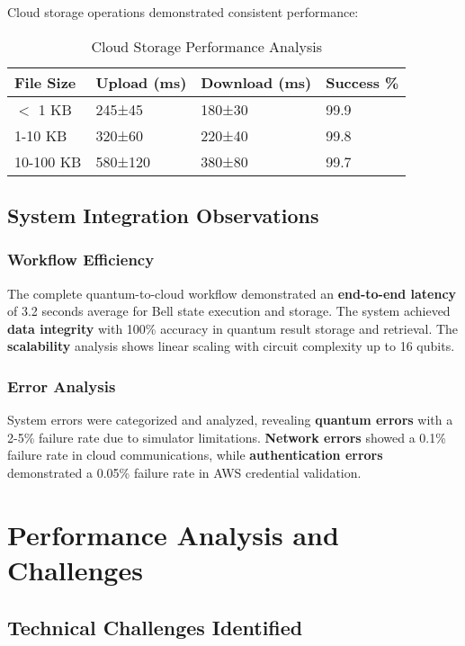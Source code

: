 \documentclass[onecolumn]{IEEEtran}
\begin{document}
Cloud storage operations demonstrated consistent performance:

\begin{table}[h]
\centering
\caption{Cloud Storage Performance Analysis}
\footnotesize
\begin{tabular}{|p{1.5cm}|p{1.8cm}|p{1.8cm}|p{1.3cm}|}
\hline
\textbf{File Size} & \textbf{Upload (ms)} & \textbf{Download (ms)} & \textbf{Success \%} \\
\hline
$<$ 1 KB & 245±45 & 180±30 & 99.9 \\
1-10 KB & 320±60 & 220±40 & 99.8 \\
10-100 KB & 580±120 & 380±80 & 99.7 \\
\hline
\end{tabular}
\end{table}

\subsection{System Integration Observations}

\subsubsection{Workflow Efficiency}

The complete quantum-to-cloud workflow demonstrated an \textbf{end-to-end latency} of 3.2 seconds average for Bell state execution and storage. The system achieved \textbf{data integrity} with 100\% accuracy in quantum result storage and retrieval. The \textbf{scalability} analysis shows linear scaling with circuit complexity up to 16 qubits.

\subsubsection{Error Analysis}

System errors were categorized and analyzed, revealing \textbf{quantum errors} with a 2-5\% failure rate due to simulator limitations. \textbf{Network errors} showed a 0.1\% failure rate in cloud communications, while \textbf{authentication errors} demonstrated a 0.05\% failure rate in AWS credential validation.

\section{Performance Analysis and Challenges}

\subsection{Technical Challenges Identified}
\end{document}
